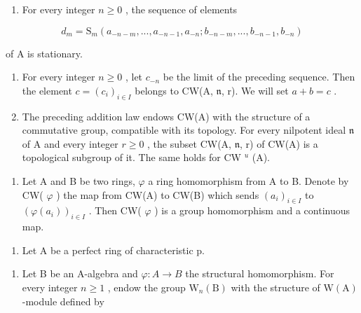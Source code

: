 \begin{enumerate}
\def\labelenumi{(\roman{enumi})}
\tightlist
\item
  For every integer \(n \geqslant 0\) , the sequence of elements
\end{enumerate}

\[
d _ {m} = \mathrm{S} _ {m} (a _ {- n - m},..., a _ {- n - 1}, a _ {- n}; b _ {- n - m},..., b _ {- n - 1}, b _ {- n})
\]

of A is stationary.

\begin{enumerate}
\def\labelenumi{(\roman{enumi})}
\setcounter{enumi}{1}
\item
  For every integer \(n \geqslant 0\) , let \(c_{-n}\) be the limit of the preceding sequence. Then the element \(c = (c_i)_{i \in I}\) belongs to CW(A, \(\mathfrak{n}\), r). We will set \(a + b = c\) .
\item
  The preceding addition law endows CW(A) with the structure of a commutative group, compatible with its topology. For every nilpotent ideal \(\mathfrak{n}\) of A and every integer \(r \geqslant 0\) , the subset CW(A, \(\mathfrak{n}\), r) of CW(A) is a topological subgroup of it. The same holds for CW \(^{u}\) (A).
\end{enumerate}

\begin{enumerate}
\def\labelenumi{\alph{enumi})}
\setcounter{enumi}{3}
\tightlist
\item
  Let A and B be two rings, \(\varphi\) a ring homomorphism from A to B. Denote by CW( \(\varphi\) ) the map from CW(A) to CW(B) which sends \((a_i)_{i\in I}\) to \((\varphi(a_i))_{i\in I}\) . Then CW( \(\varphi\) ) is a group homomorphism and a continuous map.
\end{enumerate}

\begin{enumerate}
\def\labelenumi{\arabic{enumi})}
\setcounter{enumi}{24}
\tightlist
\item
  Let A be a perfect ring of characteristic p.
\end{enumerate}

\begin{enumerate}
\def\labelenumi{\alph{enumi})}
\tightlist
\item
  Let B be an A-algebra and \(\varphi: A \to B\) the structural homomorphism. For every integer \(n \geqslant 1\) , endow the group \(\mathrm{W}_{n}(\mathrm{B})\) with the structure of \(\mathrm{W}(\mathrm{A})\) -module defined by
\end{enumerate}

